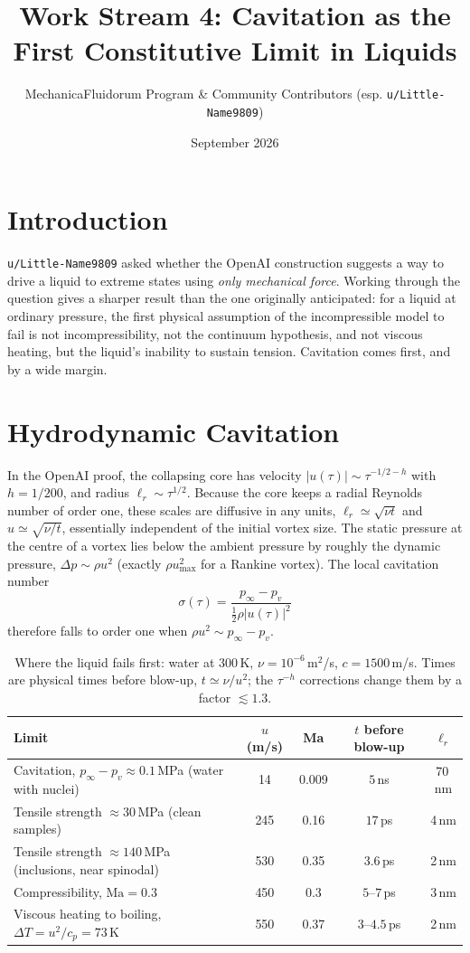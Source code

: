 \documentclass[11pt]{article}
\title{Work Stream 4: Cavitation as the First Constitutive Limit in Liquids}
\author{MechanicaFluidorum Program \& Community Contributors (esp. \texttt{u/Little-Name9809})}
\date{September 2026}
\begin{document}
\maketitle

\section{Introduction}
\texttt{u/Little-Name9809} asked whether the OpenAI construction suggests a way to drive a liquid to extreme states using \emph{only mechanical force}. Working through the question gives a sharper result than the one originally anticipated: for a liquid at ordinary pressure, the first physical assumption of the incompressible model to fail is not incompressibility, not the continuum hypothesis, and not viscous heating, but the liquid's inability to sustain tension. Cavitation comes first, and by a wide margin.

\section{Hydrodynamic Cavitation}
In the OpenAI proof, the collapsing core has velocity $|u(\tau)| \sim \tau^{-1/2-h}$ with $h = 1/200$, and radius $\ell_r \sim \tau^{1/2}$. Because the core keeps a radial Reynolds number of order one, these scales are diffusive in any units, $\ell_r \simeq \sqrt{\nu t}$ and $u \simeq \sqrt{\nu/t}$, essentially independent of the initial vortex size. The static pressure at the centre of a vortex lies below the ambient pressure by roughly the dynamic pressure, $\Delta p \sim \rho u^2$ (exactly $\rho u_{\max}^2$ for a Rankine vortex). The local cavitation number
\begin{equation}
    \sigma(\tau) = \frac{p_\infty - p_v}{\tfrac{1}{2}\rho |u(\tau)|^2}
\end{equation}
therefore falls to order one when $\rho u^2 \sim p_\infty - p_v$.

\begin{table}[h]
\centering
\caption{Where the liquid fails first: water at 300\,K, $\nu = 10^{-6}$\,m$^2$/s, $c = 1500$\,m/s. Times are physical times before blow-up, $t \simeq \nu/u^2$; the $\tau^{-h}$ corrections change them by a factor $\lesssim 1.3$.}
\begin{tabular}{@{}lcccc@{}}
\toprule
Limit & $u$ (m/s) & Ma & $t$ before blow-up & $\ell_r$ \\
\midrule
Cavitation, $p_\infty - p_v \approx 0.1$\,MPa (water with nuclei) & 14 & 0.009 & $5$\,ns & 70\,nm \\
Tensile strength $\approx 30$\,MPa (clean samples) & 245 & 0.16 & $17$\,ps & 4\,nm \\
Tensile strength $\approx 140$\,MPa (inclusions, near spinodal) & 530 & 0.35 & $3.6$\,ps & 2\,nm \\
Compressibility, $\mathrm{Ma} = 0.3$ & 450 & 0.3 & $5$--$7$\,ps & 3\,nm \\
Viscous heating to boiling, $\Delta T = u^2/c_p = 73$\,K & 550 & 0.37 & $3$--$4.5$\,ps & 2\,nm \\
\bottomrule
\end{tabular}
\end{table}
\end{document}
